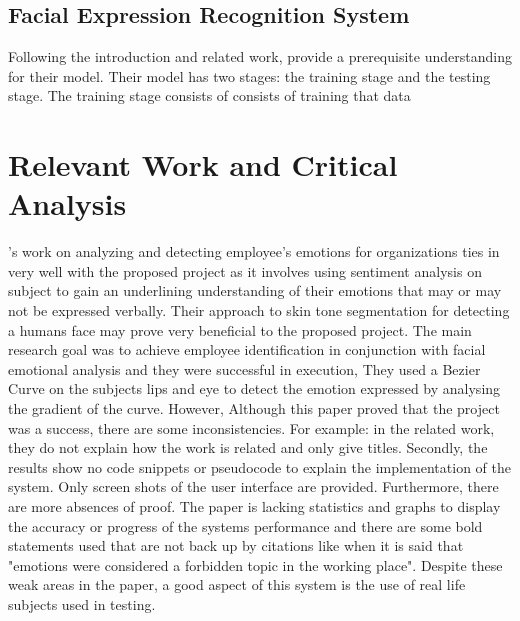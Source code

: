 \subsection{Facial Expression Recognition System}
Following the introduction and related work, \citeauthor{LOPES} provide a prerequisite understanding for their model. Their model has two stages: the training stage and the testing stage. The training stage consists of consists of training that data 

\section{Relevant Work and Critical Analysis}

\citealp{SUBHASHINI}'s work on analyzing and detecting employee's emotions for organizations ties in very well with the proposed project as it involves using sentiment analysis on subject to gain an underlining understanding of their emotions that may or may not be expressed verbally. Their approach to skin tone segmentation for detecting a humans face may prove very beneficial to the proposed project. The main research goal was to achieve employee identification in conjunction with facial emotional analysis and they were successful in execution, They used a Bezier Curve on the subjects lips and eye to detect the emotion expressed by analysing the gradient of the curve. However, Although this paper proved that the project was a success, there are some inconsistencies. For example: in the related work, they do not explain how the work is related and only give titles. Secondly, the results show no code snippets or pseudocode to explain the implementation of the system. Only screen shots of the user interface are provided. Furthermore, there are more absences of proof. The paper is lacking statistics and graphs to display the accuracy or progress of the systems performance and there are some bold statements used that are not back up by citations like when it is said that "emotions were considered a forbidden topic in the working place". Despite these weak areas in the paper, a good aspect of this system is the use of real life subjects used in testing. 

